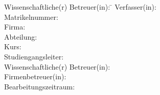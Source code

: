\begin{titlepage}
\begin{center}
		\begin{minipage}{\textwidth}
			\begin{tabbing}
				Wissenschaftliche(r) Betreuer(in): \hspace{0.85cm}\=\kill
				Verfasser(in): \> \DerAutorDerArbeit \\[1.5mm]
				Matrikelnummer: \> \DieMatrikelnummer \\[1.5mm]
				Firma: \> \DerNameDerFirma  \\[1.5mm]
				Abteilung: \> \DerNameDerAbteilung \\[1.5mm]
				Kurs: \> \DieKursbezeichnung \\[1.5mm]
				Studiengangsleiter: \> \DerStudiengangsleiter \\[1.5mm]
				Wissenschaftliche(r) Betreuer(in): \> \DerWissBetreuer \\[1.5mm]
				Firmenbetreuer(in): \> \DerFirmenBetreuer \\[1.5mm]
				Bearbeitungszeitraum: \> \DerBearbeitungszeitraum\\[1.5mm]
			\end{tabbing}
		\end{minipage}
	\end{center}
\end{titlepage}